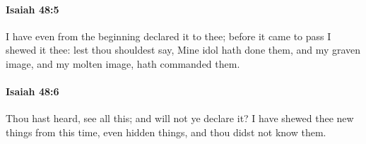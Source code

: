 		\paragraph{Isaiah 48:5} %
			\label{ISAIAH-48-5}

			I have even from the beginning declared it to thee; before it came to pass I shewed it thee: lest thou shouldest say, Mine idol hath done them, and my graven image, and my molten image, hath commanded them.


		\paragraph{Isaiah 48:6} %
			\label{ISAIAH-48-6}

			Thou hast heard, see all this; and will not ye declare it? I have shewed thee new things from this time, even hidden things, and thou didst not know them.


